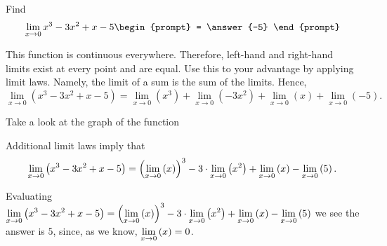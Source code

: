 \documentclass{ximera}
\author{Gregory Hartman \and Matthew Carr}
\begin{document}
\begin{exercise}



  Find 
  \[
  \lim_{x\to 0} x^3-3x^2+x-5
  \begin{prompt}
  = \answer{-5}
  \end{prompt}
  \]
    \begin{hint}
      This function is continuous everywhere. Therefore, left-hand and right-hand limits exist at every point and are equal. Use this to your advantage by applying limit laws. Namely, the limit of a sum is the sum of the limits. Hence, 
    \[
    \lim_{x\to 0} \left( x^3-3x^2+x-5 \right)  
    = \lim_{x\to 0} \left( x^3 \right) +
    \lim_{x\to 0} \left( -3x^2 \right) +
    \lim_{x\to 0} \left( x \right) +
    \lim_{x\to 0} \left(-5\right).
    \]

    \end{hint}
     \begin{hint}
    Take a look at the graph of the function
    \begin{center}
      \end{center}
    \end{hint}
    Additional limit laws imply that
    \[
    \lim_{x\to 0} \left( x^3-3x^2+x-5 \right)  
    = \p{\lim_{x\to 0} \left( x \right)}^3 -
    3\cdot\lim_{x\to 0} \left( x^2 \right) +
    \lim_{x\to 0} \left( x \right) -
    \lim_{x\to 0} \left(5\right).
    \]
    \begin{hint}
     Evaluating $\lim_{x\to 0} \left( x^3-3x^2+x-5 \right)  
    = \p{\lim_{x\to 0} \left( x \right)}^3 -
    3\cdot\lim_{x\to 0} \left( x^2 \right) +
    \lim_{x\to 0} \left( x \right) -
    \lim_{x\to 0} \left(5\right)$
    we see the answer is $5$, since, as we know, $\lim_{x\to0}\p{x}=0$.
     \end{hint}
    
\end{exercise}
\end{document}
